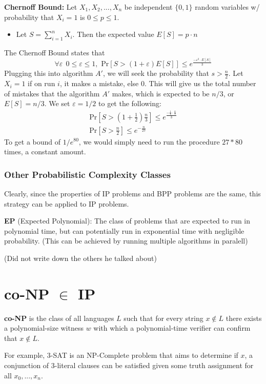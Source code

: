 \documentclass[11pt]{article}
\begin{document}
\textbf{Chernoff Bound:} Let $X_1,X_2,...,X_n$ be independent $\{0,1\}$ random variables w/ probability that $X_i = 1$ is $0 \leq p \leq 1$.
\begin{itemize}
    \item Let $S = \sum\limits_{i=1}^{n}X_i$. Then the expected value $E[S] = p \cdot n$
\end{itemize}
The Chernoff Bound states that
$$\forall \varepsilon\ \ 0 \leq \varepsilon \leq 1, \text{ Pr}[S > (1+\varepsilon)E[S]] \leq  e^{\frac{-\varepsilon^2 \cdot E[S]}{3}}$$
Plugging this into algorithm $A'$, we will seek the probability that $s > \frac{n}{2}$. Let $X_i = 1$ if on run $i$, it makes a mistake, else $0$. This will give us the total number of mistakes that the algorithm $A'$ makes, which is expected to be $n/3$, or $E[S] = n/3$. We set $\varepsilon = 1/2$ to get the following:
\begin{align*}
\text{Pr}[S > (1 + \frac{1}{2})\frac{n}{3}] \leq e^{\frac{-\frac{1}{4}\cdot \frac{n}{3}}{3}}\\
\text{Pr}[S > \frac{n}{2}] \leq e^{-\frac{n}{27}}
\end{align*}
To get a bound of $1/e^{80}$, we would simply need to run the procedure $27 * 80$ times, a constant amount.

\subsubsection{Other Probabilistic Complexity Classes}
Clearly, since the properties of IP problems and BPP problems are the same, this strategy can be applied to IP problems.
\vspace{1em}

\textbf{EP} (Expected Polynomial): The class of problems that are expected to run in polynomial time, but can potentially run in exponential time with negligible probability. (This can be achieved by running multiple algorithms in paralell)

(Did not write down the others he talked about)

\section{co-NP $\in$ IP}
\textbf{co-NP} is the class of all languages $L$ such that for every string $x \notin L$ there exists a polynomial-size witness $w$ with which a polynomial-time verifier can confirm that $x \notin L$.
\vspace{1em}

For example, $3$-SAT is an NP-Complete problem that aims to determine if $x$, a conjunction of 3-literal clauses can be satisfied given some truth assignment for all $x_0,...,x_n$.
\vspace{1em}
\end{document}
